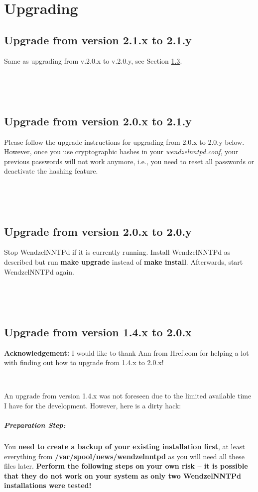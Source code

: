 \chapter{Upgrading}\label{Ch:Upgrade}


\section{Upgrade from version 2.1.x to 2.1.y}

Same as upgrading from v.2.0.x to v.2.0.y, see Section \ref{20xto20y}.

~

~

\section{Upgrade from version 2.0.x to 2.1.y}

Please follow the upgrade instructions for upgrading from 2.0.x to 2.0.y below. However, once you use cryptographic hashes in your \textit{wendzelnntpd.conf}, your previous passwords will not work anymore, i.e., you need to reset all passwords or deactivate the hashing feature.

~

~

\section{Upgrade from version 2.0.x to 2.0.y}\label{20xto20y}

Stop WendzelNNTPd if it is currently running. Install WendzelNNTPd as described but run \textbf{make upgrade} instead of \textbf{make install}. Afterwards, start WendzelNNTPd again.

~

~

\section{Upgrade from version 1.4.x to 2.0.x}

\textbf{Acknowledgement:} I would like to thank Ann from Href.com for helping a lot with finding out how to upgrade from 1.4.x to 2.0.x!

~

An upgrade from version 1.4.x was not foreseen due to the limited available time I have for the development. However, here is a dirty hack:

\paragraph*{Preparation Step:} You \textbf{need to create a backup of your existing installation first}, at least everything from \textbf{/var/spool/news/wendzelnntpd} as you will need all these files later. \textbf{Perform the following steps on your own risk -- it is possible that they do not work on your system as only two WendzelNNTPd installations were tested!}

